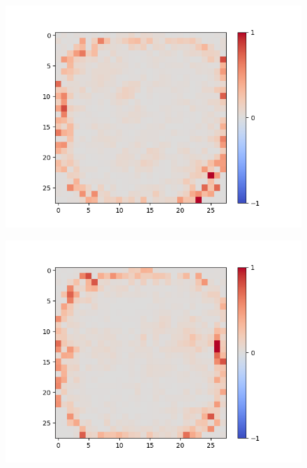 \begin{figure}[H]
\begin{minipage}[b]{0.19\textwidth}
		\includegraphics[width=\textwidth]{SAE(20LF)/Feature-10.png}
		\label{}
	\end{minipage}
	\begin{minipage}[b]{0.19\textwidth}
		\captionsetup{labelformat=empty}
		\includegraphics[width=\textwidth]{SAE(20LF)/Feature-12.png}
		\label{}
	\end{minipage}
	\begin{minipage}[b]{0.19\textwidth}
		\captionsetup{labelformat=empty}

\end{minipage}
\end{figure}
